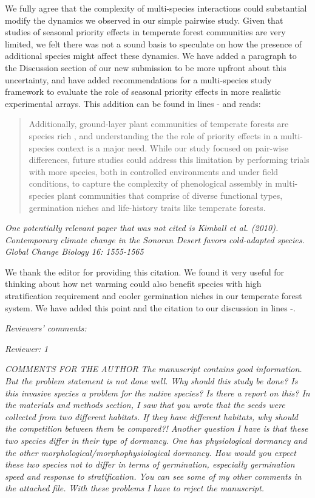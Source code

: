 \documentclass[11pt]{article}
\begin{document}
We fully agree that the complexity of multi-species interactions could substantial modify the dynamics we observed in our simple pairwise study. Given that studies of seasonal priority effects in temperate forest communities are very limited, we felt there was not a sound basis to speculate on how the presence of additional species might affect these dynamics. We have added a paragraph to the Discussion section of our new submission to be more upfront about this uncertainty, and have added recommendations for a multi-species study framework to evaluate the role of seasonal priority effects in more realistic experimental arrays. This addition can be found in lines - and reads:

\begin{quote}Additionally, ground-layer plant communities of temperate forests are species rich \citep{Whigham:2004wy}, and understanding the the role of priority effects in a multi-species context is a major need. While our study focused on pair-wise differences, future studies could address this limitation by performing trials with more species, both in controlled environments and under field conditions, to capture the complexity of phenological assembly in multi-species plant communities that comprise of diverse functional types, germination niches and life-history traits like temperate forests.\end{quote}

\emph{One potentially relevant paper that was not cited is Kimball et al. (2010). Contemporary climate change in the Sonoran Desert favors cold-adapted species. Global Change Biology 16: 1555-1565}

We thank the editor for providing this citation. We found it very useful for thinking about how net warming could also benefit species with high stratification requirement and cooler germination niches in our temperate forest system. We have added this point and the citation to our discussion in lines -.

\emph{Reviewers’ comments:}

\emph{Reviewer: 1}

\emph{COMMENTS FOR THE AUTHOR}
\emph{The manuscript contains good information. But the problem statement is not done well. Why should this study be done? Is this invasive species a problem for the native species? Is there a report on this? In the materials and methods section, I saw that you wrote that the seeds were collected from two different habitats. If they have different habitats, why should the competition between them be compared?! Another question I have is that these two species differ in their type of dormancy. One has physiological dormancy and the other morphological/morphophysiological dormancy. How would you expect these two species not to differ in terms of germination, especially germination speed and response to stratification. You can see some of my other comments in the attached file. With these problems I have to reject the manuscript.}
\end{document}
